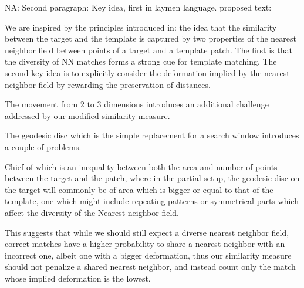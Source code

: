 \documentclass[10pt,twocolumn,letterpaper]{article}
\newcommand{\colornote}[3]{{\color{#1}\bf{#2: #3}\normalfont}}
\newcommand{\colornote}[3]{}
\newcommand {\nadav}[1]{\colornote{red}{NA}{#1}}
\begin{document}
\nadav{Second paragraph: Key idea, first in laymen language. proposed text: 

We are inspired by the principles introduced in\cite{talmi2017template}: the idea that the similarity between the target and the template is captured by two properties of the nearest neighbor field between points of a target and a template patch. The first is that the diversity of NN matches forms a strong cue for template matching. The second key idea is to explicitly consider the deformation implied by the nearest neighbor field by rewarding the preservation of distances. 

The movement from 2 to 3 dimensions introduces an additional challenge addressed by our modified similarity measure.

The geodesic disc which is the simple replacement for a search window introduces a couple of problems. 

Chief of which is an inequality between both the area and number of points between the target and the patch, where in the partial setup, the geodesic disc on the target will commonly be of area which is bigger or equal to that of the template, one which might include repeating patterns or symmetrical parts which affect the diversity of the Nearest neighbor field.

This suggests that while we should still expect a diverse nearest neighbor field, correct matches have a higher probability to share a nearest neighbor with an incorrect one, albeit one with a bigger deformation, thus our similarity measure should not penalize a shared nearest neighbor, and instead count only the match whose implied deformation is the lowest.}
\end{document}
